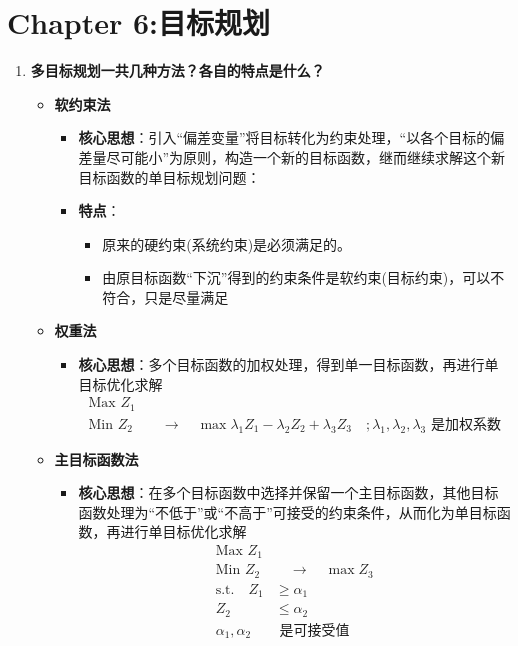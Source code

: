 	\section{Chapter 6:目标规划}
	\begin{enumerate}
		\item \textbf{多目标规划一共几种方法？各自的特点是什么？}
		\begin{itemize}			
			\item \textbf{软约束法}
			\begin{itemize}
				\item \textbf{核心思想}：引入“偏差变量”将目标转化为约束处理，“以各个目标的偏差量尽可能小”为原则，构造一个新的目标函数，继而继续求解这个新目标函数的单目标规划问题：
				\item \textbf{特点}：
				\begin{itemize}
					\item 原来的硬约束(系统约束)是必须满足的。
					\item 由原目标函数“下沉”得到的约束条件是软约束(目标约束)，可以不符合，只是尽量满足
				\end{itemize}
			\end{itemize}
			    \item \textbf{权重法}
			\begin{itemize}
				\item \textbf{核心思想}：多个目标函数的加权处理，得到单一目标函数，再进行单目标优化求解
				\begin{align*}
					\text{Max } Z_1 \\
					\text{Min } Z_2 & \quad \longrightarrow \quad \max \lambda_1 Z_1 - \lambda_2 Z_2 + \lambda_3 Z_3 \quad ; \lambda_1, \lambda_2, \lambda_3 \text{ 是加权系数}
				\end{align*}
			\end{itemize}


			\item \textbf{主目标函数法}
			\begin{itemize}
				\item \textbf{核心思想}：在多个目标函数中选择并保留一个主目标函数，其他目标函数处理为“不低于”或“不高于”可接受的约束条件，从而化为单目标函数，再进行单目标优化求解
				\begin{align*}
					\text{Max } Z_1 \\
					\text{Min } Z_2 & \quad \longrightarrow \quad \max Z_3 \\
					\text{s.t.} \quad Z_1 & \geq \alpha_1 \\
					Z_2 & \leq \alpha_2 \\
					\alpha_1, \alpha_2 & \text{ 是可接受值}
				\end{align*}
			\end{itemize}
		\end{itemize}


\end{enumerate}
